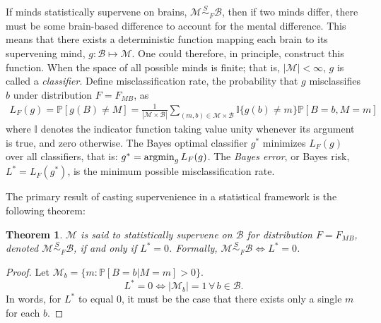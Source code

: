 \documentclass{article}
\newcommand{\mB}{\mathcal{B}}
\newcommand{\mM}{\mathcal{M}}
\newcommand{\PP}{\mathbb{P}}           %
\newcommand{\II}{\mathbb{I}}           %
\providecommand{\mc}[1]{\mathcal{#1}}
\providecommand{\mh}[1]{\widehat{#1}}
\newcommand{\argmin}{\operatornamewithlimits{argmin}}
\newcommand{\MsB}{\mM \overset{S}{\sim}_{F} \mB}
\newtheorem{thm}{Theorem}
\begin{document}
If minds statistically supervene on brains, $\MsB$, then if two minds differ, there must be some brain-based difference to account for the mental difference.  This means that there exists a deterministic function mapping each brain to its supervening mind, $g: \mB \mapsto \mM$. One could therefore, in principle, construct this function. When the space of all possible minds is finite; that is, $|\mM| < \infty$, $g$ is called a \emph{classifier}.  
Define misclassification rate, the probability that $g$ misclassifies $b$ under distribution $F=F_{MB}$,  as
\begin{align}
L_{F}(g) = \PP[g(B) \neq M] = \frac{1}{|\mc{M} \times \mc{B}|} \sum_{(m,b) \in \mc{M} \times \mc{B}} \II\{g(b) \neq m\} \PP[B=b, M=m]	
\end{align}
where $\II$ denotes the indicator function taking value unity whenever its argument is true, and zero otherwise.  The Bayes optimal classifier $g^*$ minimizes $L_{F}(g)$ over all classifiers, that is:	
$g^* = \argmin_{g} L_{F}(g)$.
The \emph{Bayes error}, or Bayes risk, $L^*=L_{F}(g^*)$, is the minimum possible misclassification rate.

The primary result of casting supervenience in a statistical framework is the following theorem: 
\begin{thm}
\label{thm1} 
$\mM$ is said to \textit{statistically supervene} on $\mB$ for distribution $F=F_{MB}$, denoted $\mM \overset{S}{\sim}_{F} \mB$, if and only if $L^*= 0$. Formally, \mbox{$\MsB \Leftrightarrow L^*=0$}.  
\end{thm}
\begin{proof}
Let $\mc{M}_b=\{m: \PP[B=b | M=m] >0\}$.  
$$L^*=0 \Leftrightarrow |\mc{M}_b|=1 \, \forall \, b \in \mc{B}.$$
In words, for $L^*$ to equal 0, it must be the case that there exists only a single $m$ for each $b$.
\end{proof}

\end{document}
